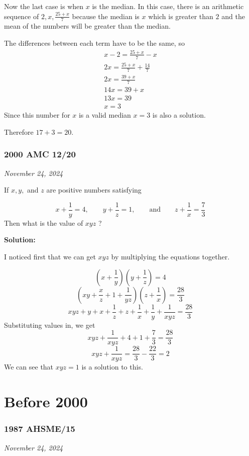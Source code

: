 \documentclass[../mathproblems.tex]{subfiles}
\begin{document}
Now the last case is when $x$ is the median. In this case, there is an arithmetic sequence of $2,x,\frac{25+x}{7}$ because the median is $x$ which is greater than $2$ and the mean of the numbers will be greater than the median.

The differences between each term have to be the same, so
\begin{align*} x-2 = \frac{25+x}{7}-x\\ 2x = \frac{25+x}{7}+\frac{14}{7}\\ 2x = \frac{39+x}{7}\\ 14x = 39+x\\ 13x = 39 \\ x = 3 \end{align*}
Since this number for $x$ is a valid median $x=3$ is also a solution.

Therefore $17+3 = \boxed{20}$.

\noindent\hrulefill
\subsubsection*{2000 AMC 12/20} 
\textit{November 24, 2024}

If $x,y,$ and $z$ are positive numbers satisfying

\[x + \frac{1}{y} = 4,\qquad y + \frac{1}{z} = 1, \qquad \text{and} \qquad z + \frac{1}{x} = \frac{7}{3}\]
Then what is the value of $xyz$ ?

\textbf{Solution:}

I noticed first that we can get $xyz$ by multiplying the equations together.

\[ \left(x+\frac{1}{y}\right) \left(y+\frac{1}{z}\right) = 4 \]\[ \left(xy + \frac{x}{z}+1+\frac{1}{yz}\right)\left(z+\frac{1}{x}\right) = \frac{28}{3} \]\[ xyz + y + x + \frac{1}{z} + z + \frac{1}{x} + \frac{1}{y} + \frac{1}{xyz} = \frac{28}{3} \]
Substituting values in, we get
\[ xyz + \frac{1}{xyz} + 4 + 1 + \frac{7}{3} = \frac{28}{3} \]\[ xyz + \frac{1}{xyz} = \frac{28}{3} - \frac{22}{3} = 2 \]
We can see that $\boxed{xyz=1}$ is a solution to this.

\noindent\hrulefill
\section{Before 2000}
\subsubsection*{1987 AHSME/15} 
\textit{November 24, 2024}
\end{document}
